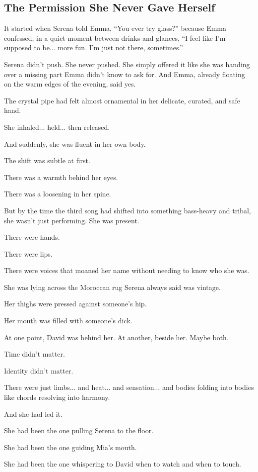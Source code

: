 
\subsection{The Permission She Never Gave Herself}

It started when Serena told Emma, “You ever try glass?” because Emma confessed, in a quiet moment between 
drinks and glances,
``I feel like I’m supposed to be... more fun. I’m just not there, sometimes.''

Serena didn’t push. She never pushed. She simply offered it like she was handing over a 
missing part Emma 
didn’t know to ask for.  And Emma, already floating on the warm edges of the evening, 
said yes.

The crystal pipe had felt almost ornamental in her delicate, curated, and safe hand.

She inhaled... held... then released.

And suddenly, she was fluent in her own body.

The shift was subtle at first. 

There was a warmth behind her eyes. 

There was a loosening in her spine. 

But by the time the third song had shifted into something bass-heavy and tribal, she 
wasn’t just performing. 
She was present.

There were hands. 

There were lips. 

There were voices that moaned her name without needing to know who she was.

She was lying across the Moroccan rug Serena always said was vintage. 

Her thighs were pressed against someone’s hip. 

Her mouth was filled with someone's dick.

At one point, David was behind her. At another, beside her. Maybe 
both. 

Time didn’t matter. 

Identity didn’t matter. 

There were just limbs... and heat... and sensation... and bodies folding 
into bodies like chords resolving into harmony.

And she had led it.

She had been the one pulling Serena to the floor. 

She had been the one guiding Mia’s mouth.

She had been the one whispering to David when to watch and when to touch.

